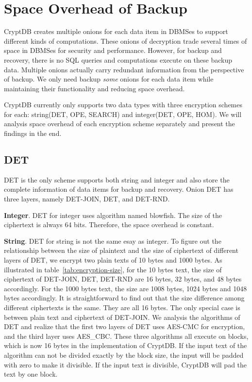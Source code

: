 \section{Space Overhead of Backup}

CryptDB creates multiple onions for each data item in DBMSes to support different kinds of computations. These onions of decryption trade several times of space in DBMSes for security and performance. However, for backup and recovery, there is no SQL queries and computations execute on these backup data. Multiple onions actually carry redundant information from the perspective of backup. We only need backup \textit{some} onions for each data item while maintaining their functionality and reducing space overhead. 


CryptDB currently only supports two data types with three encryption schemes for each: string(DET, OPE, SEARCH) and integer(DET, OPE, HOM). We will analysis space overhead of each encryption scheme separately and present the findings in the end.

\subsection{DET}
DET is the only scheme supports both string and integer and also store the complete information of data items for backup and recovery. Onion DET has three layers, namely DET-JOIN, DET, and DET-RND. 

\textbf{Integer}. DET for integer uses algorithm named blowfish. The size of the ciphertext is always 64 bits. Therefore, the space overhead is constant.

\textbf{String}. DET for string is not the same esay as integer. To figure out the relationship between the size of plaintext and the size of ciphertext of different layers of DET, we encrypt two plain texts of 10 bytes and 1000 bytes. As illustrated in table~\ref{tab:encryption-size},  for the 10 bytes text, the size of ciphertext of DET-JOIN, DET, DET-RND are 16 bytes, 32 bytes, and 48 bytes accordingly. For the 1000 bytes text, the size are 1008 bytes, 1024 bytes and 1048 bytes accordingly. It is straightforward to find out that the size difference among different ciphertexts is the same. They are all 16 bytes. The only special case is between plain text and ciphertext of DET-JOIN. We analysis the algorithms of DET and realize that the first two layers of DET uses AES-CMC for encryption, and the third layer uses AES\_CBC. These three algorithms all execute on blocks, which is now 16 bytes in the implementation of CryptDB. If the input text of the algorithm can not be divided exactly by the block size, the input will be padded with zero to make it divisible. If the input text is divisible, CryptDB will pad the text by one block. 

